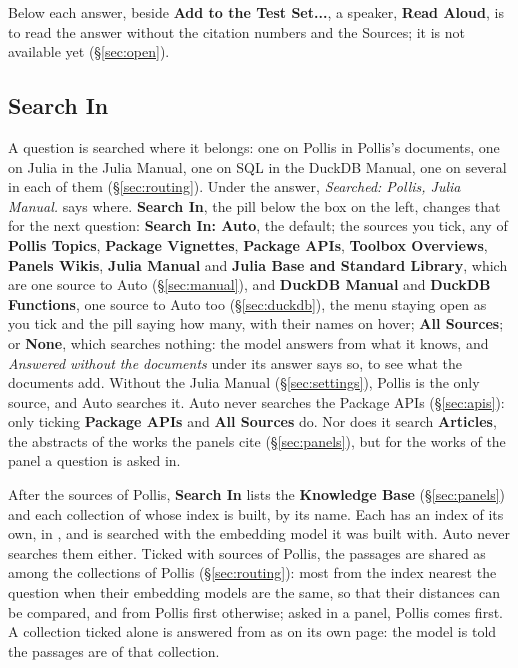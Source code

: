 Below each answer, beside \textbf{Add to the Test Set...}, a speaker, \textbf{Read Aloud}, is to read the answer
without the citation numbers and the Sources; it is not available yet (\S\ref{sec:open}).

\subsection{Search In}
A question is searched where it belongs: one on Pollis in Pollis's documents, one on Julia in the Julia Manual, one on
SQL in the DuckDB Manual, one on several in each of them (\S\ref{sec:routing}). Under the answer, \emph{Searched: Pollis, Julia Manual.} says where.
\textbf{Search In}, the pill below the box on the left, changes that for the next question: \textbf{Search In:
Auto}, the default; the sources you tick, any of \textbf{Pollis Topics}, \textbf{Package Vignettes}, \textbf{Package APIs},
\textbf{Toolbox Overviews}, \textbf{Panels Wikis}, \textbf{Julia Manual} and \textbf{Julia Base and Standard Library}, which are
one source to Auto (\S\ref{sec:manual}), and \textbf{DuckDB Manual} and \textbf{DuckDB Functions}, one source to Auto too
(\S\ref{sec:duckdb}), the menu staying open as you tick and the pill saying how many, with their
names on hover; \textbf{All Sources}; or \textbf{None}, which searches nothing:
the model answers from what it knows, and \emph{Answered without the documents} under its answer says so, to see what
the documents add. Without the Julia Manual (\S\ref{sec:settings}), Pollis is the only source, and Auto searches it.
Auto never searches the Package APIs (\S\ref{sec:apis}): only ticking \textbf{Package APIs} and \textbf{All Sources} do.
Nor does it search \textbf{Articles}, the abstracts of the works the panels cite (\S\ref{sec:panels}), but for the works
of the panel a question is asked in.

After the sources of Pollis, \textbf{Search In} lists the \textbf{Knowledge Base} (\S\ref{sec:panels}) and each
collection of  whose index is built, by
its name. Each has an index of its own, in , and is searched with the embedding model it was built
with. Auto never searches them either. Ticked with sources of Pollis, the passages are shared as among the collections
of Pollis (\S\ref{sec:routing}): most from the index nearest the question when their embedding models are the same, so
that their distances can be compared, and from Pollis first otherwise; asked in a panel, Pollis comes first. A
collection ticked alone is answered from as on its own page: the model is told the passages are of that collection.


